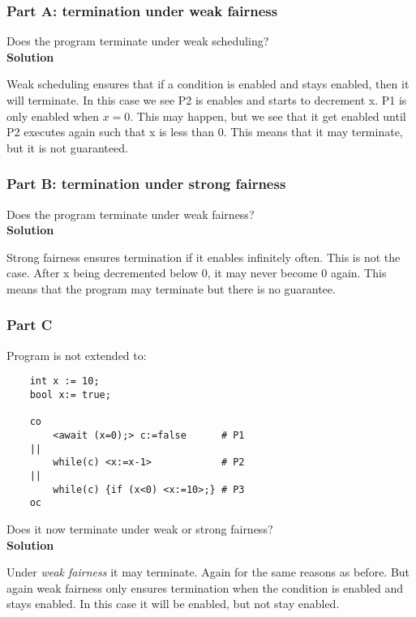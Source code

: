 \subsubsection{Part A: termination under weak fairness}

Does the program terminate under weak scheduling? \\

\textbf{Solution}

Weak scheduling ensures that if a condition is enabled and stays enabled, then it will terminate. 
In this case we see P2 is enables and starts to decrement x. P1 is only enabled when $x=0$. This may happen, but we see that it get enabled until P2 executes again such that x is less than 0.
This means that it may terminate, but it is not guaranteed.

\subsubsection{Part B: termination under strong fairness}

Does the program terminate under weak fairness? \\

\textbf{Solution}

Strong fairness ensures termination if it enables infinitely often. This is not the case. After x being decremented below 0, it may never become 0 again. 
This means that the program may terminate but there is no guarantee. 


\subsubsection{Part C}

Program is not extended to:

\begin{lstlisting}
    int x := 10;
    bool x:= true;

    co 
        <await (x=0);> c:=false      # P1
    ||
        while(c) <x:=x-1>            # P2
    ||
        while(c) {if (x<0) <x:=10>;} # P3
    oc
\end{lstlisting}

Does it now terminate under weak or strong fairness? \\ 


\textbf{Solution}

Under \textit{weak fairness} it may terminate. Again for the same reasons as before. But again weak fairness only ensures termination when the condition is enabled and stays enabled.
In this case it will be enabled, but not stay enabled. 

